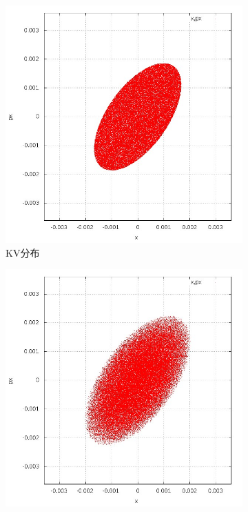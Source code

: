 \begin{figure}[!htb]
    \centering
    \begin{subfigure}[b]{0.40\textwidth}
        \includegraphics[width=\textwidth]{Img/KV_x_dx.jpg}
        \caption{KV分布}
    \end{subfigure}
    \begin{subfigure}[b]{0.40\textwidth}
        \includegraphics[width=\textwidth]{Img/WB_x_dx.jpg}

\end{subfigure}
\end{figure}
